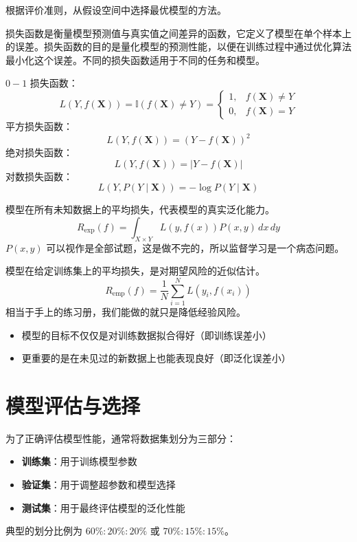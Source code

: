 \begin{definition}[策略]
    根据评价准则，从假设空间中选择最优模型的方法。
\end{definition}

\begin{definition}[损失函数]
    损失函数是衡量模型预测值与真实值之间差异的函数，它定义了模型在单个样本上的误差。损失函数的目的是量化模型的预测性能，以便在训练过程中通过优化算法最小化这个误差。不同的损失函数适用于不同的任务和模型。

    $0-1$ 损失函数：
    $$
        L(Y, f(\mathbf{X}))=\mathbb{I}(f(\mathbf{X}) \neq Y)= \begin{cases}1, & f(\mathbf{X}) \neq Y \\ 0, & f(\mathbf{X})=Y\end{cases}
    $$
    平方损失函数：
    $$
        L(Y, f(\mathbf{X}))=(Y-f(\mathbf{X}))^2
    $$
    绝对损失函数：
    $$
        L(Y, f(\mathbf{X}))=|Y-f(\mathbf{X})|
    $$
    对数损失函数：
    $$L(Y, P(Y \mid \mathbf{X}))=-\log P(Y \mid \mathbf{X})$$
\end{definition}

\begin{definition}[期望风险]
    模型在所有未知数据上的平均损失，代表模型的真实泛化能力。
    $$
        R_{\text{exp}}(f) = \int_{X \times Y} L(y, f(x)) P(x, y) \,dx\,dy
    $$
    $P(x,y)$ 可以视作是全部试题，这是做不完的，所以监督学习是一个病态问题。
\end{definition}

\begin{definition}[经验风险]
    模型在给定训练集上的平均损失，是对期望风险的近似估计。
    $$
        R_{\text{emp}}(f) = \frac{1}{N} \sum_{i=1}^{N} L(y_i, f(x_i))
    $$
    相当于手上的练习册，我们能做的就只是降低经验风险。
    \begin{itemize}
        \item 模型的目标不仅仅是对训练数据拟合得好（即训练误差小）
        \item 更重要的是在未见过的新数据上也能表现良好（即泛化误差小）
    \end{itemize}

\end{definition}



\section{模型评估与选择}

\begin{definition}
    为了正确评估模型性能，通常将数据集划分为三部分：
    \begin{itemize}
        \item \textbf{训练集}：用于训练模型参数
        \item \textbf{验证集}：用于调整超参数和模型选择
        \item \textbf{测试集}：用于最终评估模型的泛化性能
    \end{itemize}
    典型的划分比例为 $60\%:20\%:20\%$ 或 $70\%:15\%:15\%$。
\end{definition}

